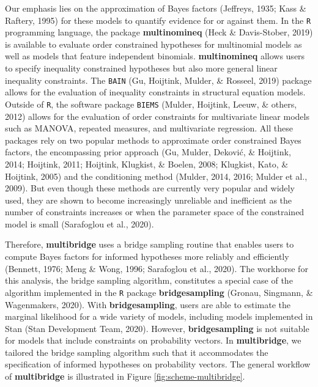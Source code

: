 \documentclass[
  english,
  man,floatsintext]{apa6}
\begin{document}
Our emphasis lies on the approximation of Bayes factors (Jeffreys, 1935; Kass \& Raftery, 1995) for these models to quantify evidence for or against them. In the \texttt{R} programming language, the package \textbf{multinomineq} (Heck \& Davis-Stober, 2019) is available to evaluate order constrained hypotheses for multinomial models as well as models that feature independent binomials. \textbf{multinomineq} allows users to specify inequality constrained hypotheses but also more general linear inequality constraints. The \texttt{BAIN} (Gu, Hoijtink, Mulder, \& Rosseel, 2019) package allows for the evaluation of inequality constraints in structural equation models. Outside of \texttt{R}, the software package \texttt{BIEMS} (Mulder, Hoijtink, Leeuw, \& others, 2012) allows for the evaluation of order constraints for multivariate linear models such as MANOVA, repeated measures, and multivariate regression. All these packages rely on two popular methods to approximate order constrained Bayes factors, the encompassing prior approach (Gu, Mulder, Deković, \& Hoijtink, 2014; Hoijtink, 2011; Hoijtink, Klugkist, \& Boelen, 2008; Klugkist, Kato, \& Hoijtink, 2005) and the conditioning method (Mulder, 2014, 2016; Mulder et al., 2009). But even though these methods are currently very popular and widely used, they are shown to become increasingly unreliable and inefficient as the number of constraints increases or when the parameter space of the constrained model is small (Sarafoglou et al., 2020).

Therefore, \textbf{multibridge} uses a bridge sampling routine that enables users to compute Bayes factors for informed hypotheses more reliably and efficiently (Bennett, 1976; Meng \& Wong, 1996; Sarafoglou et al., 2020). The workhorse for this analysis, the bridge sampling algorithm, constitutes a special case of the algorithm implemented in the \texttt{R} package \textbf{bridgesampling} (Gronau, Singmann, \& Wagenmakers, 2020). With \textbf{bridgesampling}, users are able to estimate the marginal likelihood for a wide variety of models, including models implemented in Stan (Stan Development Team, 2020). However, \textbf{bridgesampling} is not suitable for models that include constraints on probability vectors. In \textbf{multibridge}, we tailored the bridge sampling algorithm such that it accommodates the specification of informed hypotheses on probability vectors. The general workflow of \textbf{multibridge} is illustrated in Figure \ref{fig:scheme-multibridge}.
\end{document}
